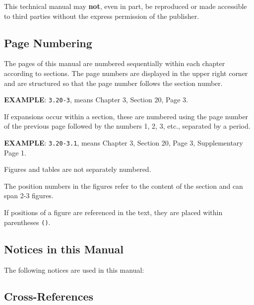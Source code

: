 This technical manual may \textbf{not}, even in part, be reproduced or made accessible to third parties without the express permission of the publisher.

\newpage

\subsection{Page Numbering}

The pages of this manual are numbered sequentially within each chapter \\according to sections. The page numbers are displayed in the upper right corner and are structured so that the page number follows the section number.

\textbf{EXAMPLE}: \texttt{3.20-3}, means Chapter 3, Section 20, Page 3.

If expansions occur within a section, these are numbered using the page number of the previous page followed by the numbers 1, 2, 3, etc., separated by a period.

\textbf{EXAMPLE}: \texttt{3.20-3.1}, means Chapter 3, Section 20, Page 3, Supplementary Page 1.

Figures and tables are not separately numbered.

The position numbers in the figures refer to the content of the section and can span 2-3 figures.

If positions of a figure are referenced in the text, they are placed within parentheses \texttt{()}.

\subsection{Notices in this Manual}

The following notices are used in this manual:




\subsection{Cross-References}

